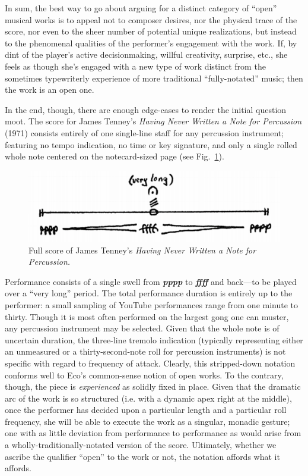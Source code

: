     In sum, the best way to go about arguing for a distinct category of ``open'' musical works is to appeal not to composer desires, nor the physical trace of the score, nor even to the sheer number of potential unique realizations, but instead to the phenomenal qualities of the performer's engagement with the work. If, by dint of the player's active decisionmaking, willful creativity, surprise, etc., she feels as though she's engaged with a new type of work distinct from the sometimes typewriterly experience of more traditional ``fully-notated'' music; then the work is an open one.
    
    In the end, though, there are enough edge-cases to render the initial question moot. The score for James Tenney's \textit{Having Never Written a Note for Percussion} (1971) consists entirely of one single-line staff for any percussion instrument; featuring no tempo indication, no time or key signature, and only a single rolled whole note centered on the notecard-sized page (see Fig.~\ref{fig:tenney}). 

            \begin{figure} 
            \centering
            \includegraphics[width=.8\textwidth]{images/chapter2/tenney.png}
            \captionsetup{width=.5\textwidth}
            \caption[Full score of James Tenney's \textit{Having Never Written a Note for Percussion.}]{Full score of James Tenney's \textit{Having Never Written a Note for Percussion.}\footnotemark}
            \label{fig:tenney}
        \end{figure}

    \noindent Performance consists of a single swell from \textbf{\textit{pppp}} to \textbf{\textit{ffff}} and back---to be played over a ``very long'' period. The total performance duration is entirely up to the performer: a small sampling of YouTube performances range from one minute to thirty. Though it is most often performed on the largest gong one can muster, any percussion instrument may be selected. Given that the whole note is of uncertain duration, the three-line tremolo indication (typically representing either an unmeasured or a thirty-second-note roll for percussion instruments) is not specific with regard to frequency of attack. Clearly, this stripped-down notation conforms well to Eco's common-sense notion of open works. To the contrary, though, the piece is \textit{experienced} as solidly fixed in place. Given that the dramatic arc of the work is so structured (i.e. with a dynamic apex right at the middle), once the performer has decided upon a particular length and a particular roll frequency, she will be able to execute the work as a singular, monadic gesture; one with as little deviation from performance to performance as would arise from a wholly-traditionally-notated version of the score. Ultimately, whether we ascribe the qualifier ``open'' to the work or not, the notation affords what it affords.

